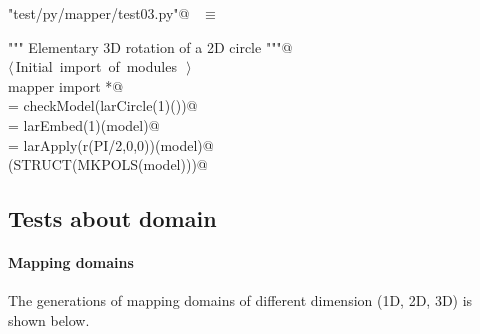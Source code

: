 \documentclass[11pt,oneside]{article}	%
\begin{document}
\begin{flushleft} \small \label{scrap45}
\verb@"test/py/mapper/test03.py"@\nobreak\ {\footnotesize {} }$\equiv$
\vspace{-1ex}
\begin{list}{}{} \item
\mbox{}\verb@""" Elementary 3D rotation of a 2D circle """@\\
\mbox{}\verb@@\hbox{$\langle\,$Initial import of modules\nobreak\ {\footnotesize {}}$\,\rangle$}\verb@@\\
\mbox{}\verb@from mapper import *@\\
\mbox{}\verb@model = checkModel(larCircle(1)())@\\
\mbox{}\verb@model = larEmbed(1)(model)@\\
\mbox{}\verb@model = larApply(r(PI/2,0,0))(model)@\\
\mbox{}\verb@VIEW(STRUCT(MKPOLS(model)))@\\
\mbox{}\verb@@{\NWsep}
\end{list}
\vspace{-2ex}
\end{flushleft}




\subsection{Tests about domain}

\paragraph{Mapping domains}
The generations of mapping domains of different dimension (1D, 2D, 3D) is shown below.
	
\end{document}
